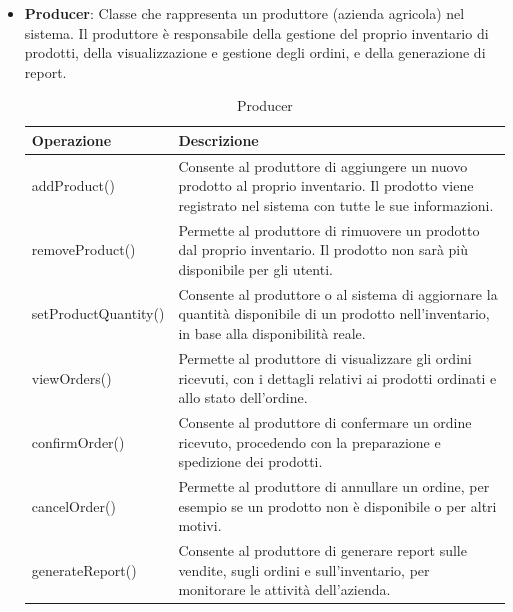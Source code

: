 \begin{itemize}
\item \textbf{Producer}:
Classe che rappresenta un produttore (azienda agricola) nel sistema. Il produttore è responsabile della gestione del proprio inventario di prodotti, della visualizzazione e gestione degli ordini, e della generazione di report.
\begin{table}[!htbp]
    \centering
    \begin{tabularx}{0.9\textwidth}{ >{\centering\arraybackslash}m{4cm} | X  } 
    \hline
         \textbf{Operazione} & \textbf{Descrizione} \\
         \hline
         addProduct() & Consente al produttore di aggiungere un nuovo prodotto al proprio inventario. Il prodotto viene registrato nel sistema con tutte le sue informazioni. \\
         \hline
         removeProduct() & Permette al produttore di rimuovere un prodotto dal proprio inventario. Il prodotto non sarà più disponibile per gli utenti. \\
         \hline
         setProductQuantity() & Consente al produttore o al sistema di aggiornare la quantità disponibile di un prodotto nell'inventario, in base alla disponibilità reale. \\
         \hline
         viewOrders() & Permette al produttore di visualizzare gli ordini ricevuti, con i dettagli relativi ai prodotti ordinati e allo stato dell'ordine. \\
         \hline
         confirmOrder() & Consente al produttore di confermare un ordine ricevuto, procedendo con la preparazione e spedizione dei prodotti. \\
         \hline
         cancelOrder() & Permette al produttore di annullare un ordine, per esempio se un prodotto non è disponibile o per altri motivi. \\
         \hline
         generateReport() & Consente al produttore di generare report sulle vendite, sugli ordini e sull'inventario, per monitorare le attività dell'azienda. \\
         \hline
    \end{tabularx}
    \caption{Producer}
\end{table}

\end{itemize}

\newpage
